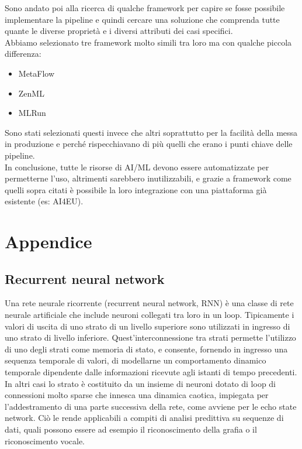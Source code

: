 \documentclass[12pt,a4paper]{report}
\begin{document}
Sono andato poi alla ricerca di qualche framework per capire se fosse possibile implementare la pipeline e quindi cercare una soluzione che comprenda tutte quante le diverse proprietà e i diversi attributi dei casi specifici.\\
Abbiamo selezionato tre framework molto simili tra loro ma con qualche piccola differenza:
\begin{itemize}
    \item MetaFlow
    \item ZenML
    \item MLRun
\end{itemize}

Sono stati selezionati questi invece che altri soprattutto per la facilità della messa in produzione e perché rispecchiavano di più quelli che erano i punti chiave delle pipeline.\\
In conclusione, tutte le risorse di AI/ML devono essere automatizzate per permetterne l'uso, altrimenti sarebbero inutilizzabili, e grazie a framework come quelli sopra citati è possibile la loro integrazione con una piattaforma già esistente (es: AI4EU).


\chapter*{Appendice} 
\section*{Recurrent neural network} 
\label{appendix:RNN}
Una rete neurale ricorrente (recurrent neural network, RNN) è una classe di rete neurale artificiale che include neuroni collegati tra loro in un loop. Tipicamente i valori di uscita di uno strato di un livello superiore sono utilizzati in ingresso di uno strato di livello inferiore. Quest'interconnessione tra strati permette l'utilizzo di uno degli strati come memoria di stato, e consente, fornendo in ingresso una sequenza temporale di valori, di modellarne un comportamento dinamico temporale dipendente dalle informazioni ricevute agli istanti di tempo precedenti. In altri casi lo strato è costituito da un insieme di neuroni dotato di loop di connessioni molto sparse che innesca una dinamica caotica, impiegata per l'addestramento di una parte successiva della rete, come avviene per le echo state network. Ciò le rende applicabili a compiti di analisi predittiva su sequenze di dati, quali possono essere ad esempio il riconoscimento della grafia o il riconoscimento vocale. \cite{itwiki:120617040}
\end{document}
